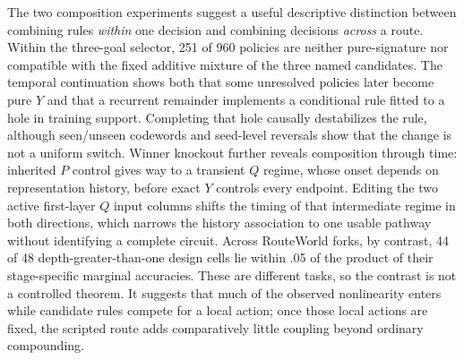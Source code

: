 \documentclass[11pt,a4paper]{article}
\begin{document}
The two composition experiments suggest a useful descriptive distinction between combining rules \emph{within} one decision and combining decisions \emph{across} a route. Within the three-goal selector, 251 of 960 policies are neither pure-signature nor compatible with the fixed additive mixture of the three named candidates. The temporal continuation shows both that some unresolved policies later become pure $Y$ and that a recurrent remainder implements a conditional rule fitted to a hole in training support. Completing that hole causally destabilizes the rule, although seen/unseen codewords and seed-level reversals show that the change is not a uniform switch. Winner knockout further reveals composition through time: inherited $P$ control gives way to a transient $Q$ regime, whose onset depends on representation history, before exact $Y$ controls every endpoint. Editing the two active first-layer $Q$ input columns shifts the timing of that intermediate regime in both directions, which narrows the history association to one usable pathway without identifying a complete circuit. Across RouteWorld forks, by contrast, 44 of 48 depth-greater-than-one design cells lie within .05 of the product of their stage-specific marginal accuracies. These are different tasks, so the contrast is not a controlled theorem. It suggests that much of the observed nonlinearity enters while candidate rules compete for a local action; once those local actions are fixed, the scripted route adds comparatively little coupling beyond ordinary compounding.
\end{document}
